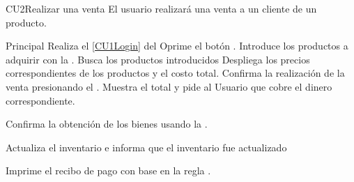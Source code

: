 
% 



	\begin{UseCase}{CU2}{Realizar una venta}{
		El usuario realizará una venta a un cliente de un producto.
	}
	\end{UseCase}

	\begin{UCtrayectoria}{Principal}
		\UCpaso Realiza el \ref{CU1Login} del 
		\UCpaso [\UCactor] Oprime el botón .
		\UCpaso[\UCactor] Introduce los productos a adquirir con la .
		\UCpaso Busca los productos introducidos 
		\UCpaso Despliega los precios correspondientes de los productos y el costo total.\label{CU2Con}
		\UCpaso[\UCactor] Confirma la realización de la venta presionando el .
		\UCpaso Muestra el total y pide al Usuario que cobre el dinero correspondiente.

		\UCpaso[\UCactor] Confirma la obtención de los bienes usando la .

		\UCpaso Actualiza el inventario e informa que el inventario fue actualizado
		
		\UCpaso Imprime el recibo de pago con base en la regla .
				
	\end{UCtrayectoria}
		
